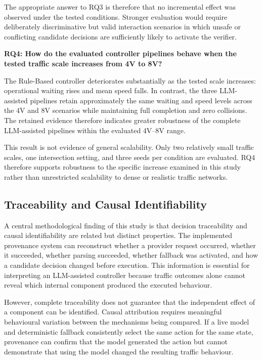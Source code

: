 \documentclass[letterpaper,10pt,conference]{ieeeconf}
\begin{document}
The appropriate answer to RQ3 is therefore that no incremental effect was observed under the tested conditions. Stronger evaluation would require deliberately discriminative but valid interaction scenarios in which unsafe or conflicting candidate decisions are sufficiently likely to activate the verifier.



\textbf{RQ4: How do the evaluated controller pipelines behave when the tested traffic scale increases from 4V to 8V?}



The Rule-Based controller deteriorates substantially as the tested scale increases: operational waiting rises and mean speed falls. In contrast, the three LLM-assisted pipelines retain approximately the same waiting and speed levels across the 4V and 8V scenarios while maintaining full completion and zero collisions. The retained evidence therefore indicates greater robustness of the complete LLM-assisted pipelines within the evaluated 4V--8V range.



This result is not evidence of general scalability. Only two relatively small traffic scales, one intersection setting, and three seeds per condition are evaluated. RQ4 therefore supports robustness to the specific increase examined in this study rather than unrestricted scalability to dense or realistic traffic networks.



\subsection{Traceability and Causal Identifiability}



A central methodological finding of this study is that decision traceability and causal identifiability are related but distinct properties. The implemented provenance system can reconstruct whether a provider request occurred, whether it succeeded, whether parsing succeeded, whether fallback was activated, and how a candidate decision changed before execution. This information is essential for interpreting an LLM-assisted controller because traffic outcomes alone cannot reveal which internal component produced the executed behaviour.



However, complete traceability does not guarantee that the independent effect of a component can be identified. Causal attribution requires meaningful behavioural variation between the mechanisms being compared. If a live model and deterministic fallback consistently select the same action for the same state, provenance can confirm that the model generated the action but cannot demonstrate that using the model changed the resulting traffic behaviour.
\end{document}
